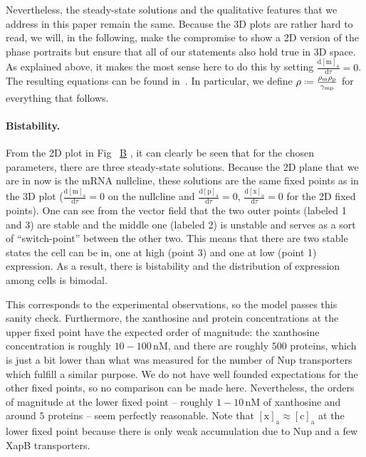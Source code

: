 \documentclass[10pt,letterpaper]{article}
\newcommand{\unit}[1]{\,\mathrm{#1}}
\newcommand{\n}[1]{\mathrm{#1}}
\newcommand{\dd}[2]{\frac{\mathrm{d} #1}{\mathrm{d} #2}}
\newcommand*{\defeq}{\mathrel{\vcenter{\baselineskip0.5ex \lineskiplimit0pt
			\hbox{\scriptsize.}\hbox{\scriptsize.}}}%
	=}
\newcommand\subref[2]{%
	\def\myref{\getrefnumber{#1}}%
	\hyperref[#1]{\myref\mbox{#2}}%
}
\begin{document}
Nevertheless, the steady-state solutions and the qualitative features that
we address in this paper remain the same. Because the 3D plots are rather
hard to read, we will, in the following, make the compromise to show a 2D
version of the phase portraits but ensure that all of our statements also
hold true in 3D space. As explained above, it makes the most sense here to
do this by setting $\dd{\n{[m]_a}}{\tau}=0$. The resulting equations can be
found in~. In particular, we define $\rho \defeq
\frac{\rho_{\n{m}} \rho_{\n{p}}}{\gamma_{\n{mp}}}$ for everything that
follows.

\paragraph*{Bistability.} 
From the 2D plot in Fig~\subref{fig4:bistability}{B}, it can clearly be seen
that for the chosen parameters, there are three steady-state solutions.
Because the 2D plane that we are in now is the mRNA nullcline, these
solutions are the same fixed points as in the 3D plot
($\dd{\n{[m]_a}}{\tau}=0$ on the nullcline and $\dd{\n{[p]_a}}{\tau}=0$,
$\dd{\n{[x]_a}}{\tau}=0$ for the 2D fixed points). One can see from the
vector field that the two outer points (labeled 1 and 3) are stable and the
middle one (labeled 2) is unstable and serves as a sort of ``switch-point''
between the other two. This means that there are two stable states the cell
can be in, one at high (point 3) and one at low (point 1) expression. As a
result, there is bistability and the distribution of expression among cells
is bimodal.

This corresponds to the experimental observations, so the model passes this
sanity check. Furthermore, the xanthosine and protein concentrations at the
upper fixed point have the expected order of magnitude: the xanthosine
concentration is roughly $10-100 \unit{nM}$, and there are roughly $500$
proteins, which is just a bit lower than what was measured for the number of
Nup transporters~\cite{Li2014} which fulfill a similar purpose. We do not
have well founded expectations for the other fixed points, so no comparison
can be made here. Nevertheless, the orders of magnitude at the lower fixed
point -- roughly $1-10 \unit{nM}$ of xanthosine and around $5$ proteins --
seem perfectly reasonable. Note that $\n{[x]_a} \approx \n{[c]_a}$ at the
lower fixed point because there is only weak accumulation due to Nup and a
few XapB transporters.
\end{document}
